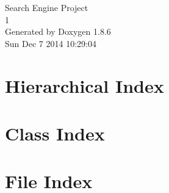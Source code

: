 \documentclass[twoside]{book}
\newcommand{\clearemptydoublepage}{%
  \newpage{\pagestyle{empty}\cleardoublepage}%
}
\begin{document}
\hypersetup{pageanchor=false}
\begin{titlepage}
\vspace*{7cm}
\begin{center}%
{\Large Search Engine Project \\[1ex]\large 1 }\\
\vspace*{1cm}
{\large Generated by Doxygen 1.8.6}\\
\vspace*{0.5cm}
{\small Sun Dec 7 2014 10:29:04}\\
\end{center}
\end{titlepage}
\clearemptydoublepage
\tableofcontents
\clearemptydoublepage
{}
\hypersetup{pageanchor=true}

\chapter{Hierarchical Index}

\chapter{Class Index}

\chapter{File Index}

\end{document}
